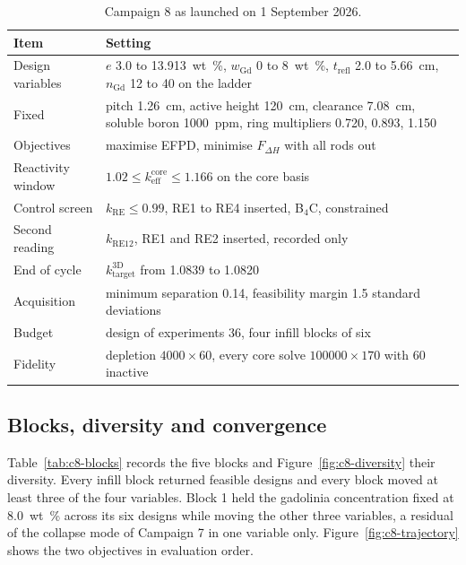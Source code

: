 \begin{table}[htbp]
  \centering
  \small
  \caption{Campaign 8 as launched on 1 September 2026.}
  \label{tab:c8-spec}
  \begin{tabularx}{\textwidth}{@{}>{\raggedright\arraybackslash}p{4.0cm}>{\raggedright\arraybackslash}X@{}}
    \toprule
    Item & Setting \\
    \midrule
    Design variables & $e$ 3.0 to \SI{13.913}{wt\%}, $w_\mathrm{Gd}$ 0 to \SI{8}{wt\%}, $t_\mathrm{refl}$ 2.0 to \SI{5.66}{cm}, $n_\mathrm{Gd}$ 12 to 40 on the ladder \\
    Fixed & pitch \SI{1.26}{cm}, active height \SI{120}{cm}, clearance \SI{7.08}{cm}, soluble boron \SI{1000}{ppm}, ring multipliers \num{0.720}, \num{0.893}, \num{1.150} \\
    Objectives & maximise EFPD, minimise $F_{\Delta H}$ with all rods out \\
    Reactivity window & $1.02 \le k_\mathrm{eff}^\mathrm{core} \le 1.166$ on the core basis \\
    Control screen & $k_\mathrm{RE} \le 0.99$, RE1 to RE4 inserted, B$_4$C, constrained \\
    Second reading & $k_\mathrm{RE12}$, RE1 and RE2 inserted, recorded only \\
    End of cycle & $k_\mathrm{target}^\mathrm{3D}$ from 1.0839 to 1.0820 \\
    Acquisition & minimum separation 0.14, feasibility margin 1.5 standard deviations \\
    Budget & design of experiments 36, four infill blocks of six \\
    Fidelity & depletion $4000\times60$, every core solve $100000\times170$ with 60 inactive \\
    \bottomrule
  \end{tabularx}
\end{table}

\subsection{Blocks, diversity and convergence}
\label{sec:res-c8-blocks}

Table~\ref{tab:c8-blocks} records the five blocks and
Figure~\ref{fig:c8-diversity} their diversity. Every infill block
returned feasible designs and every block moved at least three of the
four variables. Block 1 held the gadolinia concentration fixed at
\SI{8.0}{wt\%} across its six designs while moving the other three
variables, a residual of the collapse mode of Campaign 7 in one
variable only. Figure~\ref{fig:c8-trajectory} shows the two objectives
in evaluation order.

